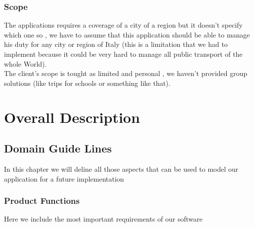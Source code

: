 \documentclass[a4paper]{book}
\begin{document}
\section{Scope}

The applications requires a coverage of a city of a region but it doesn't specify which one so , we have to assume that this application should be able to manage his duty for any city or region of Italy (this is a limitation that we had to implement because it could be very hard to manage all public transport of the whole World).\\

The client's scope is tought as limited and personal , we haven't provided group solutions (like trips for schools or something like that).

\part{Overall Description}

\chapter{Domain Guide Lines}
In this chapter we will deline all those aspects that can be used to model our application for a future implementation

\section{Product Functions}
Here we include the most important requirements of our software
\end{document}
